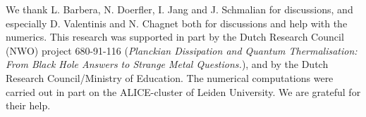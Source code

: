 \begin{acknowledgments}
\noindent
We thank L. Barbera, N. Doerfler, I. Jang and J. Schmalian for discussions, and especially D. Valentinis and N. Chagnet both for discussions and help with the numerics. 
This research was supported in part by the Dutch Research Council (NWO) project 680-91-116 ({\em Planckian Dissipation and Quantum Thermalisation: From Black Hole Answers to Strange Metal Questions.}), and by the Dutch Research Council/Ministry of Education.
The numerical computations were carried out 
in part on the ALICE-cluster of Leiden
University. We are grateful for their help.

\end{acknowledgments}
\appendix
